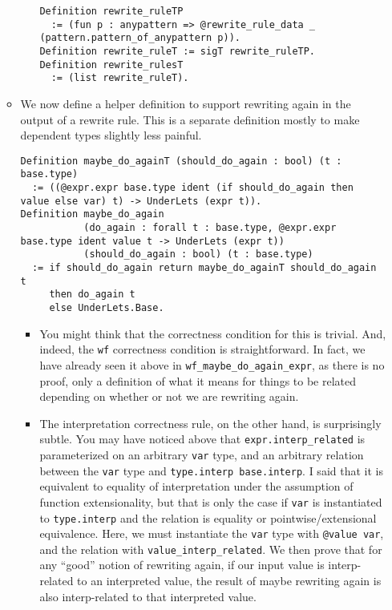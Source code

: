 \documentclass[
]{article}
\begin{document}
\begin{itemize}
\begin{itemize}
\begin{itemize}
\begin{verbatim}
Definition rewrite_ruleTP
  := (fun p : anypattern => @rewrite_rule_data _ (pattern.pattern_of_anypattern p)).
Definition rewrite_ruleT := sigT rewrite_ruleTP.
Definition rewrite_rulesT
  := (list rewrite_ruleT).
\end{verbatim}
    \end{itemize}
  \item
    We now define a helper definition to support rewriting again in the
    output of a rewrite rule. This is a separate definition mostly to
    make dependent types slightly less painful.

\begin{verbatim}
Definition maybe_do_againT (should_do_again : bool) (t : base.type)
  := ((@expr.expr base.type ident (if should_do_again then value else var) t) -> UnderLets (expr t)).
Definition maybe_do_again
           (do_again : forall t : base.type, @expr.expr base.type ident value t -> UnderLets (expr t))
           (should_do_again : bool) (t : base.type)
  := if should_do_again return maybe_do_againT should_do_again t
     then do_again t
     else UnderLets.Base.
\end{verbatim}

    \begin{itemize}
    \item
      You might think that the correctness condition for this is
      trivial. And, indeed, the \texttt{wf} correctness condition is
      straightforward. In fact, we have already seen it above in
      \texttt{wf\_maybe\_do\_again\_expr}, as there is no proof, only a
      definition of what it means for things to be related depending on
      whether or not we are rewriting again.
    \item
      The interpretation correctness rule, on the other hand, is
      surprisingly subtle. You may have noticed above that
      \texttt{expr.interp\_related} is parameterized on an arbitrary
      \texttt{var} type, and an arbitrary relation between the
      \texttt{var} type and \texttt{type.interp\ base.interp}. I said
      that it is equivalent to equality of interpretation under the
      assumption of function extensionality, but that is only the case
      if \texttt{var} is instantiated to \texttt{type.interp} and the
      relation is equality or pointwise/extensional equivalence. Here,
      we must instantiate the \texttt{var} type with
      \texttt{@value\ var}, and the relation with
      \texttt{value\_interp\_related}. We then prove that for any
      ``good'' notion of rewriting again, if our input value is
      interp-related to an interpreted value, the result of maybe
      rewriting again is also interp-related to that interpreted value.


\end{itemize}
\end{itemize}
\end{itemize}
\end{document}
